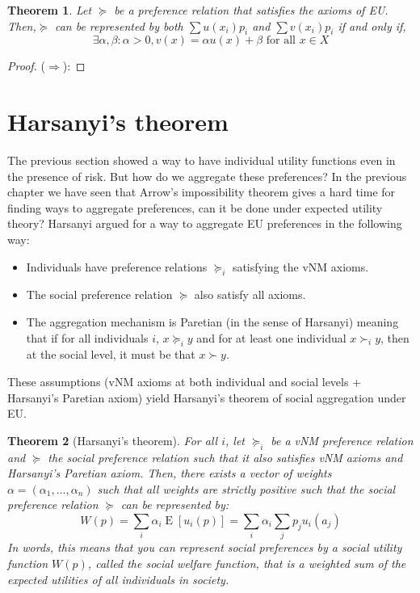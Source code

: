 \documentclass[12pt]{report}
\newtheorem{theorem}{Theorem}[chapter]
\newcommand{\E}[1]{\operatorname{E}\left[#1\right]}
\begin{document}
\begin{theorem}
Let $\succeq$ be a preference relation that satisfies the axioms of EU. Then,$\succeq$ can be represented by both $\sum u(x_i)p_i$ and $\sum v(x_i)p_i$ if and only if, $$\exists \alpha ,\beta: \alpha >0, v(x) = \alpha u(x) + \beta \text{ for all }x\in X$$
\end{theorem}

\begin{proof}
($\Rightarrow$): 
\end{proof}

\section{Harsanyi's theorem}

The previous section showed a way to have individual utility functions even in the presence of risk. But how do we aggregate these preferences? In the previous chapter we have seen that Arrow's impossibility theorem gives a hard time for finding ways to aggregate preferences, can it be done under expected utility theory? Harsanyi argued for a way to aggregate EU preferences in the following way:\begin{itemize}
\item Individuals have preference relations $\succeq_i$ satisfying the vNM axioms.
\item The social preference relation $\succeq$ also satisfy all axioms.
\item The aggregation mechanism is Paretian (in the sense of Harsanyi) meaning that if for all individuals $i$, $x\succeq_i y$ and for at least one individual $x\succ_i y$, then at the social level, it must be that $x \succ y$.
\end{itemize}

These assumptions (vNM axioms at both individual and social levels + Harsanyi's Paretian axiom) yield Harsanyi's theorem of social aggregation under EU.

\begin{theorem}[Harsanyi's theorem]
For all $i$, let $\succeq_i$ be a vNM preference relation and $\succeq$ the social preference relation such that it also satisfies vNM axioms and Harsanyi's Paretian axiom. Then, there exists a vector of weights $\alpha = (\alpha_1, ..., \alpha_n)$ such that all weights are strictly positive such that the social preference relation $\succeq$ can be represented by: $$W(p) = \sum_i \alpha_i \E{u_i(p)} = \sum_i\alpha_i\sum_j p_ju_i(a_j) $$ In words, this means that you can represent social preferences by a social utility function $W(p)$, called the social welfare function, that is a weighted sum of the expected utilities of all individuals in society.
\end{theorem}
\end{document}
